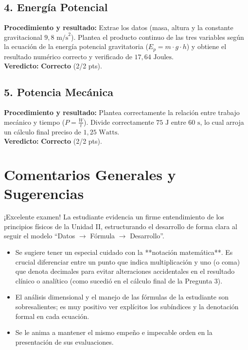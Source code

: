 \documentclass[12pt,letterpaper]{article}
\begin{document}
\subsection*{4. Energía Potencial}
\textbf{Procedimiento y resultado:} Extrae los datos (masa, altura y la constante gravitacional $9,8 \text{ m/s}^2$). Plantea el producto continuo de las tres variables según la ecuación de la energía potencial gravitatoria ($E_p = m \cdot g \cdot h$) y obtiene el resultado numérico correcto y verificado de $17,64 \text{ Joules}$. \\
\textbf{Veredicto:} \textbf{Correcto} (2/2 pts).

\subsection*{5. Potencia Mecánica}
\textbf{Procedimiento y resultado:} Plantea correctamente la relación entre trabajo mecánico y tiempo ($P = \frac{W}{t}$). Divide correctamente $75 \text{ J}$ entre $60 \text{ s}$, lo cual arroja un cálculo final preciso de $1,25 \text{ Watts}$. \\
\textbf{Veredicto:} \textbf{Correcto} (2/2 pts).

\vspace{0.5cm}
\section*{Comentarios Generales y Sugerencias}
¡Excelente examen! La estudiante evidencia un firme entendimiento de los principios físicos de la Unidad II, estructurando el desarrollo de forma clara al seguir el modelo ``Datos $\rightarrow$ Fórmula $\rightarrow$ Desarrollo''.
\begin{itemize}
    \item Se sugiere tener un especial cuidado con la **notación matemática**. Es crucial diferenciar entre un punto que indica multiplicación y uno (o coma) que denota decimales para evitar alteraciones accidentales en el resultado clínico o analítico (como sucedió en el cálculo final de la Pregunta 3).
    \item El análisis dimensional y el manejo de las fórmulas de la estudiante son sobresalientes; es muy positivo ver explícitos los subíndices y la denotación formal en cada ecuación.
    \item Se le anima a mantener el mismo empeño e impecable orden en la presentación de sus evaluaciones.
\end{itemize}
\end{document}
